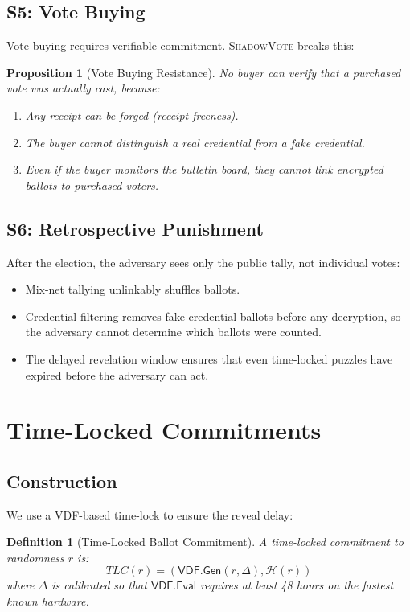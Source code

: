 \documentclass[11pt,a4paper]{article}
\newcommand{\shadow}{\textsc{ShadowVote}\xspace}
\newcommand{\HH}{\mathcal{H}}
\newtheorem{definition}{Definition}
\newtheorem{proposition}{Proposition}
\begin{document}
\subsection{S5: Vote Buying}

Vote buying requires verifiable commitment. \shadow breaks this:

\begin{proposition}[Vote Buying Resistance]
No buyer can verify that a purchased vote was actually cast, because:
\begin{enumerate}
    \item Any receipt can be forged (receipt-freeness).
    \item The buyer cannot distinguish a real credential from a fake credential.
    \item Even if the buyer monitors the bulletin board, they cannot link encrypted ballots to purchased voters.
\end{enumerate}
\end{proposition}

\subsection{S6: Retrospective Punishment}

After the election, the adversary sees only the public tally, not individual votes:

\begin{itemize}
    \item Mix-net tallying unlinkably shuffles ballots.
    \item Credential filtering removes fake-credential ballots before any decryption, so the adversary cannot determine which ballots were counted.
    \item The delayed revelation window ensures that even time-locked puzzles have expired before the adversary can act.
\end{itemize}

\section{Time-Locked Commitments}

\subsection{Construction}

We use a VDF-based time-lock to ensure the reveal delay:

\begin{definition}[Time-Locked Ballot Commitment]
A time-locked commitment to randomness $r$ is:
\begin{equation}
    \mathit{TLC}(r) = (\mathsf{VDF}.\mathsf{Gen}(r, \Delta), \HH(r))
\end{equation}
where $\Delta$ is calibrated so that $\mathsf{VDF}.\mathsf{Eval}$ requires at least 48 hours on the fastest known hardware.
\end{definition}
\end{document}
